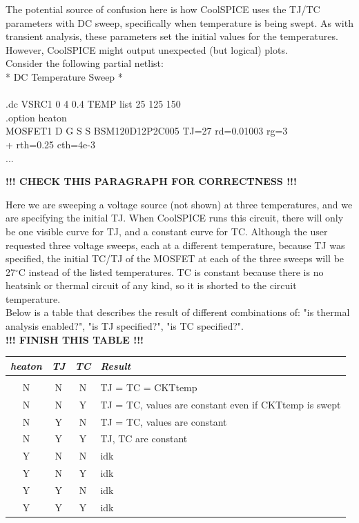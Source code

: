 The potential source of confusion here is how CoolSPICE uses the TJ/TC parameters with DC sweep, specifically when temperature is being swept. As with transient analysis, these parameters set the initial values for the temperatures. However, CoolSPICE might output unexpected (but logical) plots. \\

Consider the following partial netlist: \\

{\selectfont
	* DC Temperature Sweep * \\ \\
	\indent .dc VSRC1 0 4 0.4 TEMP list 25 125 150 \\
	\indent .option heaton \\
	\indent MOSFET1 D G S S BSM120D12P2C005 TJ=27 rd=0.01003 rg=3 \\ \indent + rth=0.25 cth=4e-3 \\
	\indent ... \\
}

\textbf{!!! CHECK THIS PARAGRAPH FOR CORRECTNESS !!!}

Here we are sweeping a voltage source (not shown) at three temperatures, and we are specifying the initial TJ. When CoolSPICE runs this circuit, there will only be one visible curve for TJ, and a constant curve for TC. Although the user requested three voltage sweeps, each at a different temperature, because TJ was specified, the initial TC/TJ of the MOSFET at each of the three sweeps will be 27$^{\circ}$C instead of the listed temperatures. TC is constant because there is no heatsink or thermal circuit of any kind, so it is shorted to the circuit temperature. \\ 

Below is a table that describes the result of different combinations of: "is thermal analysis enabled?", "is TJ specified?", "is TC specified?". \\

\textbf{!!! FINISH THIS TABLE !!!}

\begin{tabular}{c c c l}
	\textit{heaton} & \textit{TJ} & \textit{TC} & \textit{Result} \\ 
	\hline \\
	N & N & N & TJ = TC = CKTtemp \\
	N & N & Y & TJ = TC, values are constant even if CKTtemp is swept \\
	N & Y & N & TJ = TC, values are constant \\
	N & Y & Y & TJ, TC are constant \\
	Y & N & N & idk \\
	Y & N & Y & idk \\
	Y & Y & N & idk \\
	Y & Y & Y & idk \\
\end{tabular}

